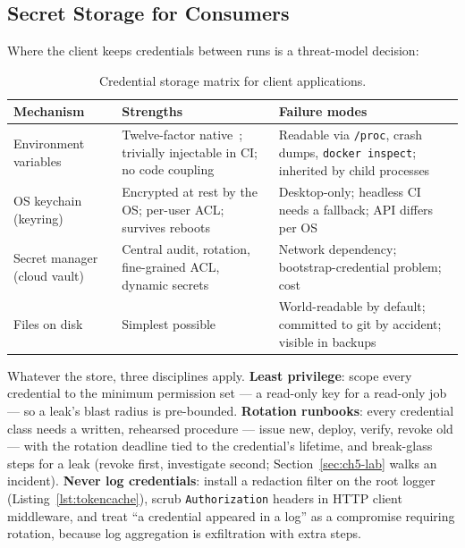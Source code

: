 \subsection{Secret Storage for Consumers}
\label{sec:ch5-storage}

Where the client keeps credentials between runs is a threat-model decision:

\begin{table}[ht]
\centering\small
\begin{tabularx}{\textwidth}{l X X}
\toprule
\textbf{Mechanism} & \textbf{Strengths} & \textbf{Failure modes} \\
\midrule
Environment variables & Twelve-factor native~\cite{twelvefactor}; trivially
injectable in CI; no code coupling & Readable via \texttt{/proc}, crash dumps,
\texttt{docker inspect}; inherited by child processes \\
OS keychain (keyring) & Encrypted at rest by the OS; per-user ACL; survives
reboots & Desktop-only; headless CI needs a fallback; API differs per OS \\
Secret manager (cloud vault) & Central audit, rotation, fine-grained ACL,
dynamic secrets & Network dependency; bootstrap-credential problem; cost \\
Files on disk & Simplest possible & World-readable by default; committed to
git by accident; visible in backups \\
\bottomrule
\end{tabularx}
\caption{Credential storage matrix for client applications.}
\label{tab:ch5-storage}
\end{table}

Whatever the store, three disciplines apply. \textbf{Least privilege}: scope
every credential to the minimum permission set --- a read-only key for a
read-only job --- so a leak's blast radius is pre-bounded. \textbf{Rotation
runbooks}: every credential class needs a written, rehearsed procedure ---
issue new, deploy, verify, revoke old --- with the rotation deadline tied to
the credential's lifetime, and break-glass steps for a leak (revoke first,
investigate second; Section~\ref{sec:ch5-lab} walks an incident).
\textbf{Never log credentials}: install a redaction filter on the root
logger (Listing~\ref{lst:tokencache}), scrub \texttt{Authorization} headers
in HTTP client middleware, and treat ``a credential appeared in a log'' as a
compromise requiring rotation, because log aggregation is exfiltration with
extra steps.

